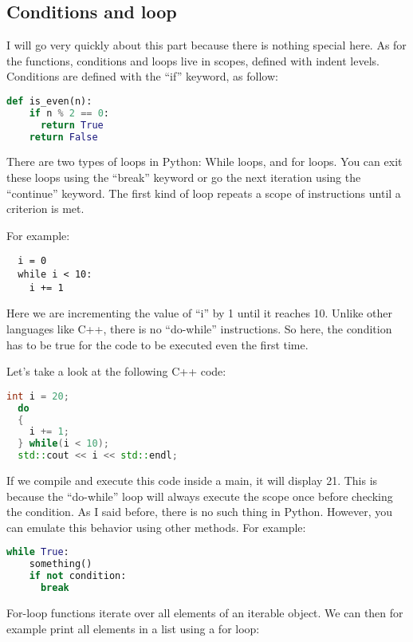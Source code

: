 \subsection{Conditions and loop}
I will go very quickly about this part because there is nothing special here.
As for the functions, conditions and loops live in scopes, defined with indent levels.
Conditions are defined with the ``if'' keyword, as follow:

\begin{lstlisting}[language=python]
  def is_even(n):
    if n % 2 == 0:
      return True
    return False
\end{lstlisting}

There are two types of loops in Python: While loops, and for loops. You can exit
these loops using the ``break'' keyword or go the next iteration using the ``continue''
keyword. The first kind of loop repeats a scope of instructions until a criterion is met.

For example:

\begin{lstlisting}
  i = 0
  while i < 10:
    i += 1
\end{lstlisting}

Here we are incrementing the value of ``i'' by 1 until it reaches 10. Unlike other
languages like C++, there is no ``do-while'' instructions. So here, the condition has
to be true for the code to be executed even the first time.

Let's take a look at the following C++ code:

\begin{lstlisting}[language=C++]
  int i = 20;
  do
  {
    i += 1;
  } while(i < 10);
  std::cout << i << std::endl;
\end{lstlisting}

If we compile and execute this code inside a main, it will display 21. This is because
the ``do-while'' loop will always execute the scope once before checking the condition.
As I said before, there is no such thing in Python. However, you can emulate this behavior
using other methods. For example:

\begin{lstlisting}[language=python]
  while True:
    something()
    if not condition:
      break
\end{lstlisting}

For-loop functions iterate over all elements of an iterable object. We can then for example
print all elements in a list using a for loop:


